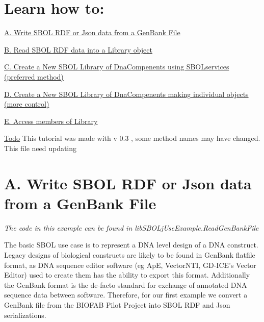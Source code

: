 \hypertarget{tutorial_sec_toc}{}\section{Learn how to:}\label{tutorial_sec_toc}
\hyperlink{tutorial_A}{A. Write SBOL RDF or Json data from a GenBank File} \par
 \hyperlink{tutorial_B}{B. Read SBOL RDF data into a Library object} \par
 \hyperlink{tutorial_C}{C. Create a New SBOL Library of DnaCompenents using SBOLservices (preferred method)} \par
 \hyperlink{tutorial_D}{D. Create a New SBOL Library of DnaCompenents making individual objects (more control)} \par
 \hyperlink{tutorial_E}{E. Access members of Library} \par


\begin{Desc}
\item[\hyperlink{todo__todo000002}{Todo}]This tutorial was made with v 0.3 , some method names may have changed. This file need updating\end{Desc}




\hypertarget{tutorial_A}{}\section{A. Write SBOL RDF or Json data from a GenBank File}\label{tutorial_A}
{\itshape The code in this example can be found in libSBOLjUseExample.ReadGenBankFile\/}

The basic SBOL use case is to represent a DNA level design of a DNA construct. Legacy designs of biological constructs are likely to be found in GenBank flatfile format, as DNA sequence editor software (eg ApE, VectorNTI, GD-\/ICE's Vector Editor) used to create them has the ability to export this format. Additionally the GenBank format is the de-\/facto standard for exchange of annotated DNA sequence data between software. Therefore, for our first example we convert a GenBank file from the BIOFAB Pilot Project into SBOL RDF and Json serializations.


